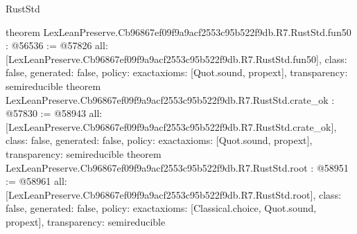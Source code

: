 \begin{lexlean}{RustStd}
\begin{coremodule}
{}
theorem LexLeanPreserve.Cb96867ef09f9a9acf2553c95b522f9db.R7.RustStd.fun50 : @56536 := @57826 {
  all: [LexLeanPreserve.Cb96867ef09f9a9acf2553c95b522f9db.R7.RustStd.fun50],
  class: false,
  generated: false,
  policy: exact{axioms: [Quot.sound, propext]},
  transparency: semireducible
}
theorem LexLeanPreserve.Cb96867ef09f9a9acf2553c95b522f9db.R7.RustStd.crate_ok : @57830 := @58943 {
  all: [LexLeanPreserve.Cb96867ef09f9a9acf2553c95b522f9db.R7.RustStd.crate_ok],
  class: false,
  generated: false,
  policy: exact{axioms: [Quot.sound, propext]},
  transparency: semireducible
}
theorem LexLeanPreserve.Cb96867ef09f9a9acf2553c95b522f9db.R7.RustStd.root : @58951 := @58961 {
  all: [LexLeanPreserve.Cb96867ef09f9a9acf2553c95b522f9db.R7.RustStd.root],
  class: false,
  generated: false,
  policy: exact{axioms: [Classical.choice, Quot.sound, propext]},
  transparency: semireducible
}


\end{coremodule}
\end{lexlean}
